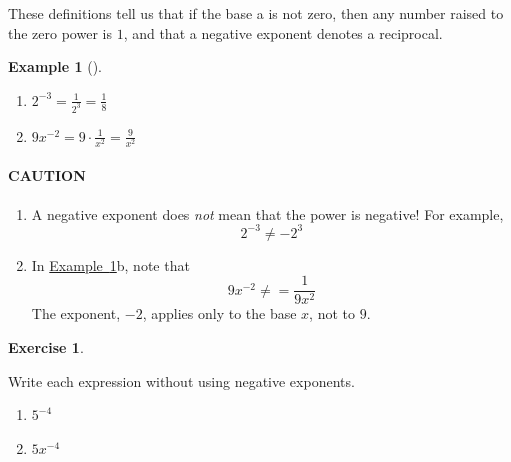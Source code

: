 \documentclass[10pt,]{book}
\theoremstyle{plain}
\theoremstyle{definition}
\theoremstyle{definition}
\theoremstyle{definition}
\newtheorem{example}[theorem]{Example}
\theoremstyle{definition}
\theoremstyle{definition}
\newtheorem{exercise}[theorem]{Exercise}
\numberwithin{equation}{section}
\begin{document}
    These definitions tell us that if the base a is not zero, then any number raised to the zero power is \(1\), and that a negative exponent denotes a reciprocal.
%
\begin{example}[]\label{example-integer-exponents}
\leavevmode%
\begin{enumerate}[label=*\alph**]
\item\hypertarget{li-416}{}\(2^{−3} = \frac{1}{2^3}= \frac{1}{8}\)\item\hypertarget{li-417}{}\(9x^{−2} = 9 \cdot \frac{1}{x^2}= \frac{9}{x^2}\)\end{enumerate}
\end{example}
\typeout{************************************************}
\typeout{************************************************}
\paragraph[CAUTION]{CAUTION}\label{paragraphs-44}
\leavevmode%
\begin{enumerate}
\item\hypertarget{li-418}{}A negative exponent does \emph{not} mean that the power is negative! For example,
    \begin{equation*}2^{−3}\ne −2^3\end{equation*}\item\hypertarget{li-419}{}In \hyperref[example-integer-exponents]{Example~\ref{example-integer-exponents}}b, note that 
    \begin{equation*}9x^{−2} \ne = \frac{1}{9x^2}\end{equation*} 
    The exponent, \(−2\), applies only to the base \(x\), not to \(9\).
\end{enumerate}
%
\begin{exercise}\label{exercise-integer-exponents}

    Write each expression without using negative exponents.
    \leavevmode%
\begin{enumerate}[label=*\alph**]
\item\hypertarget{li-420}{}\(5^{−4}\)\item\hypertarget{li-421}{}\(5x^{−4}\)\end{enumerate}

%
\end{exercise}
\par
\end{document}
